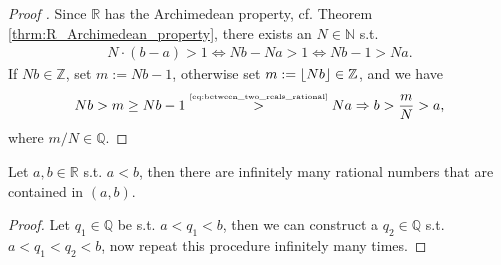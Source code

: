 \begin{proof}[Proof \cite{421600,3434503}]
	Since $\mathbb R$ has the Archimedean property, cf. Theorem \ref{thrm:R_Archimedean_property}, there exists an $N\in\mathbb N$ s.t. 
	\begin{align}\label{eq:between_two_reals_rational}
		N \cdot (b - a) > 1\Leftrightarrow Nb - Na > 1\Leftrightarrow Nb - 1 > Na.
	\end{align} 
	If $Nb\in\mathbb Z$, set $m := Nb - 1$, otherwise set $m := \lfloor Nb \rfloor \in\mathbb Z$, and we have
	$$Nb > m \geq Nb - 1 \overset{\tiny\eqref{eq:between_two_reals_rational}}{>} Na\Rightarrow b > \frac{m}{N} > a,$$ where $m/N\in\mathbb Q$.
\end{proof}

\begin{corollary}
	Let $a, b\in\mathbb R$ s.t. $a < b$, then there are infinitely many rational numbers that are contained in $(a, b)$.
\end{corollary}

\begin{proof}
	Let $q_1\in\mathbb Q$ be s.t. $a < q_1 < b$, then we can construct a $q_2\in\mathbb Q$ s.t. $a < q_1 < q_2 < b$, now repeat this procedure infinitely many times.
\end{proof}